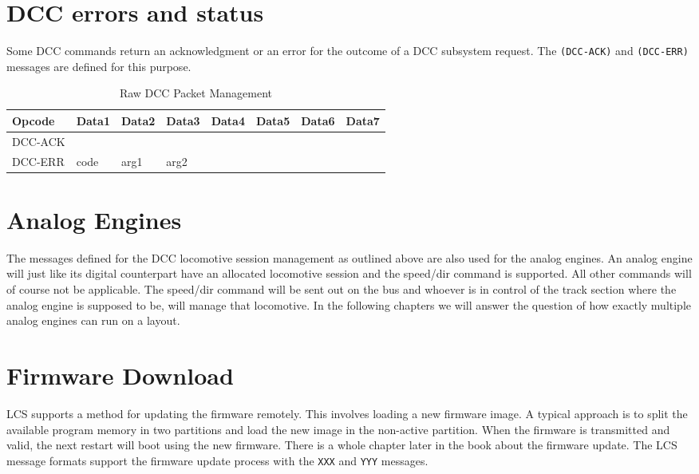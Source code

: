 \section{DCC errors and status}

Some DCC commands return an acknowledgment or an error for the outcome of a DCC subsystem request. The \texttt{(DCC-ACK)} and \texttt{(DCC-ERR)} messages are defined for this purpose.

\begin{table}[ht!]
    \begin{center}
        \caption{Raw DCC Packet Management}
        \begin{tabular}{|l|l|l|l|l|l|l|l|}
            \toprule
            \textbf{Opcode}  & \textbf{Data1} & \textbf{Data2} & \textbf{Data3} & \textbf{Data4} & \textbf{Data5} & \textbf{Data6} & \textbf{Data7} \\
            \midrule
            DCC-ACK & & & & & & & \\
            DCC-ERR & code & arg1 & arg2 & & & & \\
            \bottomrule
        \end{tabular}
    \end{center}
\end{table}

\section{Analog Engines}

The messages defined for the DCC locomotive session management as outlined above are also used for the analog engines. An analog engine will just like its digital counterpart have an allocated locomotive session and the speed/dir command is supported. All other commands will of course not be applicable. The speed/dir command will be sent out on the bus and whoever is in control of the track section where the analog engine is supposed to be, will manage that locomotive. In the following chapters we will answer the question of how exactly multiple analog engines can run on a layout.

\section{Firmware Download}

LCS supports a method for updating the firmware remotely. This involves loading a new firmware image. A typical approach is to split the available program memory in two partitions and load the new image in the non-active partition. When the firmware is transmitted and valid, the next restart will boot using the new firmware. There is a whole chapter later in the book about the firmware update. The LCS message formats support the firmware update process with the \texttt{XXX} and \texttt{YYY} messages.

